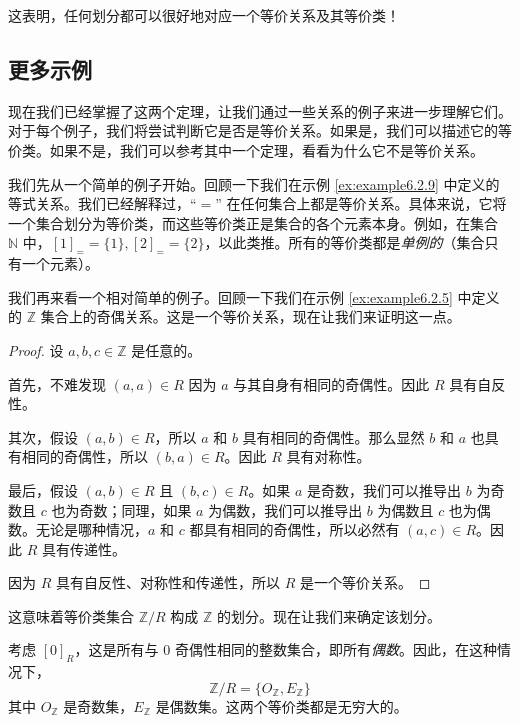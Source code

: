 这表明，任何划分都可以很好地对应一个等价关系及其等价类！

\subsection{更多示例}

现在我们已经掌握了这两个定理，让我们通过一些关系的例子来进一步理解它们。对于每个例子，我们将尝试判断它是否是等价关系。如果是，我们可以描述它的等价类。如果不是，我们可以参考其中一个定理，看看为什么它不是等价关系。\\

\begin{example}
    我们先从一个简单的例子开始。回顾一下我们在示例 \ref{ex:example6.2.9} 中定义的等式关系。我们已经解释过，``$=$'' 在任何集合上都是等价关系。具体来说，它将一个集合划分为等价类，而这些等价类正是集合的各个元素本身。例如，在集合 $\mathbb{N}$ 中，$[1]_{=} = \{1\}, [2]_{=} = \{2\}$，以此类推。所有的等价类都是\emph{单例的}（集合只有一个元素）。
\end{example}

\begin{example}
    我们再来看一个相对简单的例子。回顾一下我们在示例 \ref{ex:example6.2.5} 中定义的 $\mathbb{Z}$ 集合上的奇偶关系。这是一个等价关系，现在让我们来证明这一点。
    \begin{proof}
        设 $a, b, c \in \mathbb{Z}$ 是任意的。

        首先，不难发现 $(a,a) \in R$ 因为 $a$ 与其自身有相同的奇偶性。因此 $R$ 具有自反性。

        其次，假设 $(a,b) \in R$，所以 $a$ 和 $b$ 具有相同的奇偶性。那么显然 $b$ 和 $a$ 也具有相同的奇偶性，所以 $(b,a) \in R$。因此 $R$ 具有对称性。

        最后，假设 $(a,b) \in R$ 且 $(b,c) \in R$。如果 $a$ 是奇数，我们可以推导出 $b$ 为奇数且 $c$ 也为奇数；同理，如果 $a$ 为偶数，我们可以推导出 $b$ 为偶数且 $c$ 也为偶数。无论是哪种情况，$a$ 和 $c$ 都具有相同的奇偶性，所以必然有 $(a,c) \in R$。因此 $R$ 具有传递性。

        因为 $R$ 具有自反性、对称性和传递性，所以 $R$ 是一个等价关系。
    \end{proof}

    这意味着等价类集合 $\mathbb{Z}/R$ 构成 $\mathbb{Z}$ 的划分。现在让我们来确定该划分。

    考虑 $[0]_R$，这是所有与 $0$ 奇偶性相同的整数集合，即所有\emph{偶数}。因此，在这种情况下，
    \[\mathbb{Z}/R = \{O_{\mathbb{Z}}, E_{\mathbb{Z}}\}\]
    其中 $O_{\mathbb{Z}}$ 是奇数集，$E_{\mathbb{Z}}$ 是偶数集。这两个等价类都是无穷大的。
\end{example}

